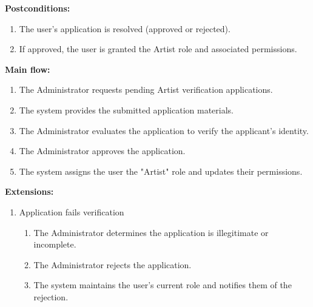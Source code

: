 \documentclass{article}
\begin{document}
{\bfseries Postconditions:}
\begin{enumerate}
	\item The user's application is resolved (approved or rejected).
	\item If approved, the user is granted the Artist role and associated permissions.
\end{enumerate}

{\bfseries Main flow:}
\begin{enumerate}
	\item The Administrator requests pending Artist verification applications.
	\item The system provides the submitted application materials.
	\item The Administrator evaluates the application to verify the applicant's identity.
	\item The Administrator approves the application.
	\item The system assigns the user the "Artist" role and updates their permissions.
\end{enumerate}

{\bfseries Extensions:}
\begin{enumerate}
	\item [3a.] Application fails verification
	\begin{enumerate}
		\item [3a1.] The Administrator determines the application is illegitimate or incomplete.
		\item [3a2.] The Administrator rejects the application.
		\item [3a3.] The system maintains the user's current role and notifies them of the rejection.
	\end{enumerate}
\end{enumerate}
\end{document}
